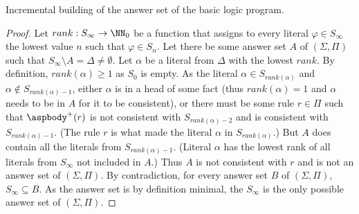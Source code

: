 \begin{lemma}{Incremental building of the answer set of the basic logic program.}
\begin{proof}
        Let $rank: S_\infty \to \NN_0$ be a function that assigns to every literal
        $\varphi \in S_\infty$ the lowest value $n$ such that $\varphi \in S_n$.
        Let there be some answer set $A$ of $(\Sigma, \Pi)$ such that
        $S_\infty\setminus A = \Delta \neq \emptyset$.
        Let $\alpha$ be a literal from $\Delta$ with the lowest $rank$.
        By definition, $rank(\alpha) \geq 1$ as $S_0$ is empty.
        As the literal $\alpha\in S_{rank(\alpha)}$ and $\alpha \not\in S_{rank(\alpha)-1}$,
        either $\alpha$ is in a head of some fact (thus $rank(\alpha)=1$ and $\alpha$
        needs to be in $A$ for it to be consistent),
        or there must be some rule $r\in\Pi$ such that $\aspbody^+(r)$ is not consistent
        with $S_{rank(\alpha)-2}$ and is consistent with $S_{rank(\alpha)-1}$.
        (The rule $r$ is what made the literal $\alpha$ in $S_{rank(\alpha)}$.)
        But $A$ does contain all the literals from $S_{rank(\alpha)-1}$. (Literal $\alpha$
        has the lowest rank of all literals from $S_\infty$ not included in $A$.)
        Thus $A$ is not consistent with $r$ and is not an answer set of $(\Sigma, \Pi)$.
        By contradiction, for every answer set $B$ of $(\Sigma, \Pi)$,
        $S_\infty \subseteq B$. As the answer set is by definition minimal,
        the $S_\infty$ is the only possible answer set of $(\Sigma, \Pi)$.
    \end{proof}
\end{lemma}


